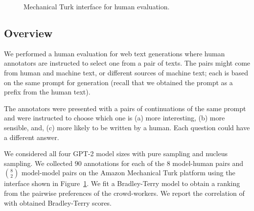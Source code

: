 \documentclass{article}
\theoremstyle{definition}
\newcommand{\name}{{\fontfamily{bch}\selectfont{\textsc{Mauve}}}\xspace}
\begin{document}
\begin{figure}[t!]
    \centering
    \caption{Mechanical Turk interface for human evaluation.}
    \label{fig:mauve:human-eval-interface}
\end{figure}



\subsection{Overview}
\label{sec:a:human-eval:overview}

We performed a human evaluation for web text generations 
where human annotators are instructed to select one from a pair of texts.
The pairs might come from human and machine text, or different sources of machine text; each is based on the same prompt for generation (recall that we obtained the prompt as a prefix from the human text).

The annotators were presented with a pairs of continuations of the same prompt and were instructed 
to choose which one is (a) more interesting, (b) more sensible, and, (c) more likely to be written by a human. Each question could have a different answer.

We considered all four GPT-2 model sizes with pure sampling and nucleus sampling. 
We collected $90$ annotations for each of the 
$8$ model-human pairs and ${8\choose 2}$
model-model pairs on the Amazon Mechanical Turk platform
using the interface shown in Figure~\ref{fig:mauve:human-eval-interface}.
We fit a Bradley-Terry model to obtain a ranking from 
the pairwise preferences of the crowd-workers. 
We report the correlation of \name with 
obtained Bradley-Terry scores. 
\end{document}
